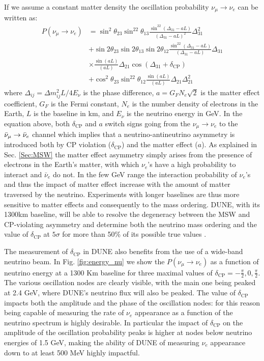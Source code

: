 If we assume a constant matter density the oscillation probability $\nu_\mu\rightarrow\nu_e$ can be written as:
\begin{equation} \label{eq1}
    \begin{split}
        P(\nu_\mu\rightarrow\nu_e) & = \sin^2\theta_{23} \sin^22\theta_{13} \frac{\sin^22(\Delta_{31}-aL)}{(\Delta_{31}-aL)^2}\Delta_{31}^2\\
         &  +\sin2\theta_{23} \sin2\theta_{13} \sin2\theta_{12} \frac{\sin^22(\Delta_{31}-aL)}{(\Delta_{31}-aL)}\Delta_{31}\\
         & \times\frac{\sin(aL)}{(aL)}\Delta_{21} \cos(\Delta_{31}+\delta_\textrm{CP})\\
         & +\cos^2\theta_{23} \sin^22\theta_{12} \frac{\sin(aL)}{(aL)}\Delta_{21} \Delta_{21}^2
    \end{split}
\end{equation}
where $\Delta_{ij}=\Delta m_{ij}^2L/4E_\nu$ is the phase difference, $a = G_FN_e\sqrt{2}$ is the matter effect coefficient, $G_F$ is the Fermi constant, $N_e$ is the number density of electrons in the Earth, $L$ is the baseline in km, and $E_\nu$ is the neutrino energy in GeV. In the equation above, both $\delta_\textrm{CP}$ and $a$ switch signs going from the $\nu_\mu\rightarrow\nu_e$ to the $\bar{\nu}_\mu\rightarrow\Bar{\nu}_e$ channel which implies that a neutrino-antineutrino asymmetry is introduced both by CP violation ($\delta_\textrm{CP}$) and the matter effect ($a$). As explained in Sec. \ref{Sec:MSW} the matter effect asymmetry simply arises from the presence of electrons in the Earth's matter, with which $\nu_e$'s have a high probability to interact and $\bar{\nu}_e$ do not. In the few GeV range the interaction probability of $\nu_e$'s and thus the impact of matter effect increase with the amount of matter traversed by the neutrino. Experiments with longer baselines are thus more sensitive to matter effects and consequently to the mass ordering. DUNE, with its 1300km baseline, will be able to resolve the degeneracy between the MSW and CP-violating asymmetry and determine both the neutrino mass ordering and the value of $\delta_\text{CP}$ at $5\sigma$ for more than 50\% of its possible true values \cite{Diwan:2004bt}.

The measurement of $\delta_\text{CP}$ in DUNE also benefits from the use of a wide-band neutrino beam. In Fig. \ref{fig:energy_nu} we show the $P(\nu_\mu\rightarrow\nu_e)$ as a function of neutrino energy at a 1300 Km baseline for three maximal values of $\delta_\text{CP}=-\frac{\pi}{2},0,\frac{\pi}{2}$. The various oscillation nodes are clearly visible, with the main one being peaked at 2.4 GeV, where DUNE's neutrino flux will also be peaked. The value of $\delta_\text{CP}$ impacts both the amplitude and the phase of the oscillation nodes: for this reason being capable of measuring the rate of $\nu_e$ appearance as a function of the neutrino spectrum is highly desirable. In particular the impact of $\delta_\text{CP}$ on the amplitude of the oscillation probability peaks is higher at nodes below neutrino energies of 1.5 GeV, making the ability of DUNE of measuring $\nu_e$ appearance down to at least 500 MeV highly impactful.

